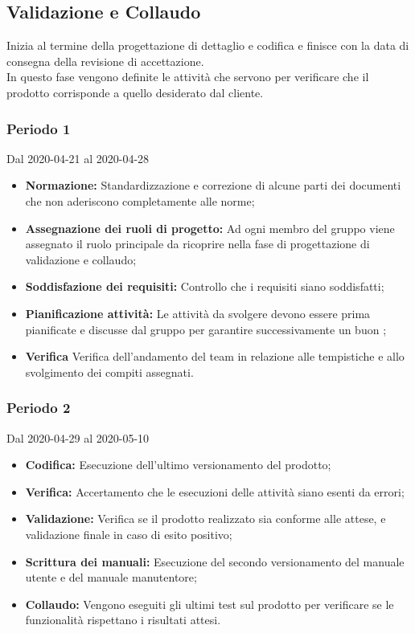 \subsection{Validazione e Collaudo}
Inizia al termine della progettazione di dettaglio e codifica e finisce con la data di consegna della revisione di accettazione.
\\In questo fase vengono definite le attività che servono per verificare che il prodotto corrisponde a quello desiderato dal cliente.
\subsubsection{Periodo 1} 
Dal 2020-04-21 al 2020-04-28
\begin{itemize}
	\item \textbf{Normazione:} Standardizzazione e correzione di alcune parti dei documenti che non aderiscono completamente alle norme;
	\item \textbf{Assegnazione dei ruoli di progetto:} Ad ogni membro del gruppo viene assegnato il ruolo principale da ricoprire nella fase di progettazione di validazione e collaudo;
	\item \textbf{Soddisfazione dei requisiti:} Controllo che i requisiti siano soddisfatti;
	\item \textbf{Pianificazione attività:} Le attività da svolgere devono essere prima pianificate e discusse dal gruppo per garantire successivamente un buon ;
	\item \textbf{Verifica} Verifica dell'andamento del team in relazione alle tempistiche e allo svolgimento dei compiti assegnati.
\end{itemize}
\subsubsection{Periodo 2} 
Dal 2020-04-29 al 2020-05-10
\begin{itemize}
	\item \textbf{Codifica:} Esecuzione dell'ultimo versionamento del prodotto;
	\item \textbf{Verifica:} Accertamento che le esecuzioni delle attività siano esenti da errori;
	\item \textbf{Validazione:} Verifica se il prodotto realizzato sia conforme alle attese, e validazione finale in caso di esito positivo;
	\item \textbf{Scrittura dei manuali:} Esecuzione del secondo versionamento del manuale utente e del manuale manutentore;
	\item \textbf{Collaudo:} Vengono eseguiti gli ultimi test sul prodotto per verificare se le funzionalità rispettano i risultati attesi.
\end{itemize}
